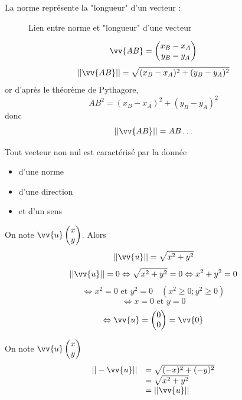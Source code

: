\begin{remarque}
La norme représente la "longueur" d'un vecteur : \newline
\begin{figure}[H]
\centering
{}
\caption{Lien entre norme et "longueur" d'une vecteur}
\end{figure}
$$\vv{AB} = \covec{x_B - x_A}{y_B - y_A}$$
$$||\vv{AB}|| = \sqrt{(x_B - x_A)^2+(y_B - y_A)^2}$$
or d'après le théorème de Pythagore, 
$$AB^2 = (x_B - x_A)^2+(y_B - y_A)^2$$
donc 
$$||\vv{AB}|| = AB\ldots$$
\end{remarque}
Tout vecteur non nul est caractérisé par la donnée \begin{itemize} \item d'une norme \item d'une direction \item et d'un sens\end{itemize}
\newline

\begin{preuve}
On note $\vv{u} \covec{x}{y}$. Alors 
$$||\vv{u}|| = \sqrt{x^2 + y^2}$$
$$||\vv{u}|| = 0 \Leftrightarrow \sqrt{x^2+y^2} = 0 \Leftrightarrow x^2+y^2 = 0$$
$$\Leftrightarrow x^2 = 0 \text{ et } y^2 = 0 \quad (x^2 \geq 0; y^2 \geq 0)$$
$$\Leftrightarrow x = 0 \text{ et } y = 0$$
$$\Leftrightarrow \vv{u} = \covec{0}{0} = \vv{0}$$
\end{preuve}
\newline

\begin{preuve}
On note $\vv{u} \covec{x}{y}$
$$
\begin{array}{l l}
||-\vv{u}|| &= \sqrt{(-x)^2 + (-y)^2}\\
&= \sqrt{x^2+y^2}\\
&= ||\vv{u}||
\end{array}
$$
\end{preuve}
\newline

